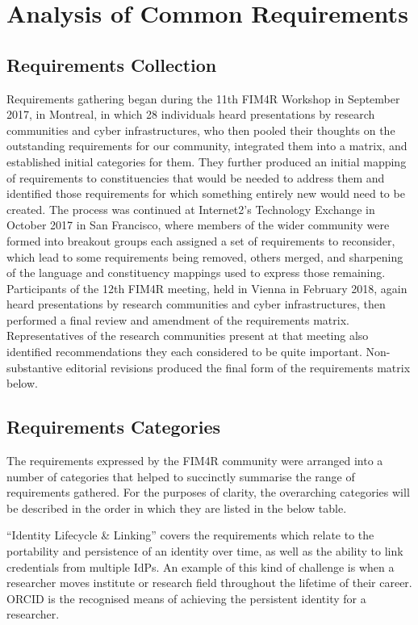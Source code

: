 \documentclass[fleqn,10pt]{wlscirep}
\begin{document}
{\section{Analysis of Common Requirements}

\subsection{Requirements Collection}
Requirements gathering began during the 11th FIM4R Workshop in September 2017, in Montreal, in which 28 individuals heard presentations by research communities and cyber infrastructures, who then pooled their thoughts on the outstanding requirements for our community, integrated them into a matrix, and established initial categories for them. They further produced an initial mapping of requirements to constituencies that would be needed to address them and identified those requirements for which something entirely new would need to be created. The process was continued at Internet2’s Technology Exchange in October 2017 in San Francisco, where members of the wider community were formed into breakout groups each assigned a set of requirements to reconsider, which lead to some requirements being removed, others merged, and sharpening of the language and constituency mappings used to express those remaining. Participants of the 12th FIM4R meeting, held in Vienna in February 2018, again heard presentations by research communities and cyber infrastructures, then performed a final review and amendment of the requirements matrix. Representatives of the research communities present at that meeting also identified recommendations they each considered to be quite important. Non-substantive editorial revisions produced the final form of the requirements matrix below.

\subsection{Requirements Categories}
The requirements expressed by the FIM4R community were arranged into a number of categories that helped to succinctly summarise the range of requirements gathered.  For the purposes of clarity, the overarching categories will be described in the order in which they are listed in the below table.

“Identity Lifecycle \& Linking” covers the requirements which relate to the portability and persistence of an identity over time, as well as the ability to link credentials from multiple IdPs.  An example of this kind of challenge is when a researcher moves institute or research field throughout the lifetime of their career.  ORCID is the recognised means of achieving the persistent identity for a researcher.

}
\end{document}
